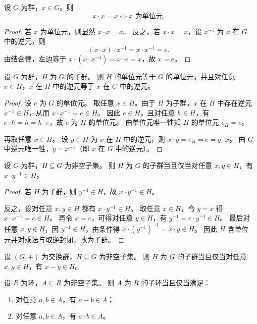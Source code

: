\documentclass[lang=cn,a4paper,newtx]{elegantbook}
\begin{document}
\begin{proposition}
设 $G$ 为群，$x\in G$。则
\[
  x\cdot x=x\iff x\text{ 为单位元}.
\]
\end{proposition}

\begin{proof}
若 $x$ 为单位元，则显然 $x\cdot x=x$。
反之，若 $x\cdot x=x$，设 $x^{-1}$ 为 $x$ 在 $G$ 中的逆元，则
\[
  (x\cdot x)\cdot x^{-1}=x\cdot x^{-1}=e.
\]
由结合律，左边等于 $x\cdot (x\cdot x^{-1})=x\cdot e=x$，故 $x=e$。
\end{proof}

\begin{proposition}
设 $G$ 为群，$H$ 为 $G$ 的子群。
则 $H$ 的单位元等于 $G$ 的单位元，并且对任意 $x\in H$，$x$ 在 $H$ 中的逆元等于 $x$ 在 $G$ 中的逆元。
\end{proposition}

\begin{proof}
设 $e$ 为 $G$ 的单位元。
取任意 $x\in H$。由于 $H$ 为子群，$x$ 在 $H$ 中存在逆元 $x^{-1}\in H$，从而 $x\cdot x^{-1}=e\in H$。
因此 $e\in H$，且对任意 $h\in H$，有 $e\cdot h=h=h\cdot e$，故 $e$ 为 $H$ 的单位元。
由单位元唯一性知 $H$ 的单位元 $e_H=e$。

再取任意 $x\in H$。
设 $y\in H$ 为 $x$ 在 $H$ 中的逆元，则 $x\cdot y=e_H=e=y\cdot x$。
由 $G$ 中逆元唯一性，$y=x^{-1}$（即 $x$ 在 $G$ 中的逆元）。
\end{proof}

\begin{proposition}[子群判别]
设 $G$ 为群，$H\subseteq G$ 为非空子集。
则 $H$ 为 $G$ 的子群当且仅当对任意 $x,y\in H$，有 $x\cdot y^{-1}\in H$。
\end{proposition}

\begin{proof}
若 $H$ 为子群，则 $y^{-1}\in H$，故 $x\cdot y^{-1}\in H$。

反之，设对任意 $x,y\in H$ 都有 $x\cdot y^{-1}\in H$。
取任意 $x\in H$，令 $y=x$ 得 $x\cdot x^{-1}=e\in H$。
再令 $x=e$，可得对任意 $y\in H$，有 $y^{-1}=e\cdot y^{-1}\in H$。
最后对任意 $x,y\in H$，因 $y^{-1}\in H$，由条件得 $x\cdot (y^{-1})^{-1}=x\cdot y\in H$。
因此 $H$ 含单位元并对乘法与取逆封闭，故为子群。
\end{proof}

\begin{corollary}[交换群的子群判别]
设 $(G,+)$ 为交换群，$H\subseteq G$ 为非空子集。
则 $H$ 为 $G$ 的子群当且仅当对任意 $x,y\in H$，有 $x-y\in H$。
\end{corollary}

\begin{proposition}[子环判别]
设 $R$ 为环，$A\subseteq R$ 为非空子集。
则 $A$ 为 $R$ 的子环当且仅当满足：
\begin{enumerate}
  \item 对任意 $a,b\in A$，有 $a-b\in A$；
  \item 对任意 $a,b\in A$，有 $a\cdot b\in A$。
\end{enumerate}
\end{proposition}
\end{document}
